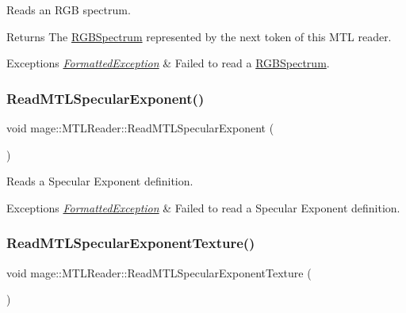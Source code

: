 Reads an R\+GB spectrum.

\begin{DoxyReturn}{Returns}
The {\ttfamily \hyperlink{structmage_1_1_r_g_b_spectrum}{R\+G\+B\+Spectrum}} represented by the next token of this M\+TL reader. 
\end{DoxyReturn}

\begin{DoxyExceptions}{Exceptions}
{\em \hyperlink{structmage_1_1_formatted_exception}{Formatted\+Exception}} & Failed to read a {\ttfamily \hyperlink{structmage_1_1_r_g_b_spectrum}{R\+G\+B\+Spectrum}}. \\
\hline
\end{DoxyExceptions}
\hypertarget{classmage_1_1_m_t_l_reader_a0ac9c6202ff7fa921d551e1aaa59b33f}{}\label{classmage_1_1_m_t_l_reader_a0ac9c6202ff7fa921d551e1aaa59b33f} 
\subsubsection{\texorpdfstring{Read\+M\+T\+L\+Specular\+Exponent()}{ReadMTLSpecularExponent()}}
{\footnotesize\ttfamily void mage\+::\+M\+T\+L\+Reader\+::\+Read\+M\+T\+L\+Specular\+Exponent (\begin{DoxyParamCaption}{ }\end{DoxyParamCaption})\hspace{0.3cm}{\ttfamily [private]}}

Reads a Specular Exponent definition.


\begin{DoxyExceptions}{Exceptions}
{\em \hyperlink{structmage_1_1_formatted_exception}{Formatted\+Exception}} & Failed to read a Specular Exponent definition. \\
\hline
\end{DoxyExceptions}
\hypertarget{classmage_1_1_m_t_l_reader_a9b68187f940dc05a5d86527843f09d18}{}\label{classmage_1_1_m_t_l_reader_a9b68187f940dc05a5d86527843f09d18} 
\subsubsection{\texorpdfstring{Read\+M\+T\+L\+Specular\+Exponent\+Texture()}{ReadMTLSpecularExponentTexture()}}
{\footnotesize\ttfamily void mage\+::\+M\+T\+L\+Reader\+::\+Read\+M\+T\+L\+Specular\+Exponent\+Texture (\begin{DoxyParamCaption}{ }\end{DoxyParamCaption})\hspace{0.3cm}{\ttfamily [private]}}

